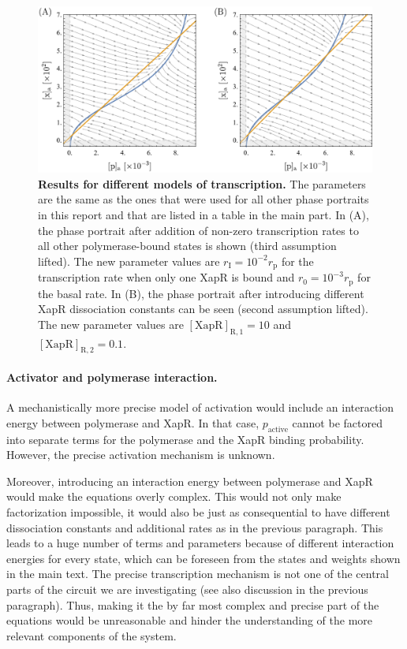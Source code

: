 \documentclass[10pt,letterpaper]{article}
\newcommand{\n}[1]{\mathrm{#1}}
\begin{document}
\begin{figure}
	\centering
	\includegraphics[width=\textwidth]{FigSI1.pdf}
	\caption{{\bf Results for different models of transcription.}
		The parameters are the same as the ones that were used for all other
		phase portraits in this report and that are listed in a table in the
		main part. In (A), the phase portrait after addition of non-zero
		transcription rates to all other polymerase-bound states is shown
		(third assumption lifted). The new parameter values are $r_{\n{I}} =
		10^{-2} r_{\n{p}}$ for the transcription rate when only one XapR is
		bound and $r_{\n{0}} = 10^{-3} r_{\n{p}}$ for the basal rate. In
		(B), the phase portrait after introducing different XapR
		dissociation constants can be seen (second assumption lifted). The
		new parameter values are $\n{[XapR]_{R,1}} = 10$ and
		$\n{[XapR]_{R,2}} = 0.1$.}
	\label{figS1:transcription}
\end{figure}

\paragraph*{Activator and polymerase interaction.}
A mechanistically more precise model of activation would include an
interaction energy between polymerase and XapR. In that case,
$p_{\n{active}}$ cannot be factored into separate terms for the polymerase
and the XapR binding probability. However, the precise activation mechanism
is unknown.

Moreover, introducing an interaction energy between polymerase and XapR
would make the equations overly complex. This would not only make
factorization impossible, it would also be just as consequential to have
different dissociation constants and additional rates as in the previous
paragraph. This leads to a huge number of terms and parameters because of
different interaction energies for every state, which can be foreseen from
the states and weights shown in the main text. The precise transcription
mechanism is not one of the central parts of the circuit we are
investigating (see also discussion in the previous paragraph). Thus, making
it the by far most complex and precise part of the equations would be
unreasonable and hinder the understanding of the more relevant components of
the system.
\end{document}
